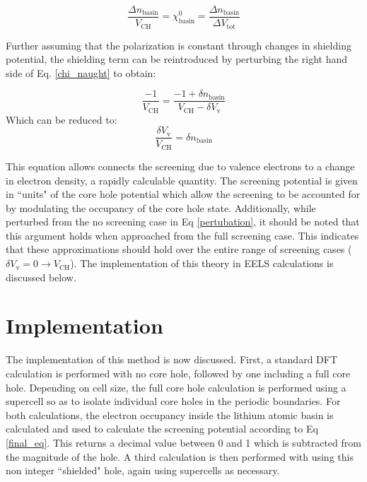 \begin{equation}
\frac{\Delta n _{\mathrm{basin}}}{V_{\mathrm{CH}}} = \chi^0_{\mathrm{basin}} = \frac{\Delta n _{\mathrm{basin}}}{\Delta V_{\mathrm{tot}}}
\label{chi_naught}
\end{equation}

Further assuming that the polarization is constant through changes in shielding potential, the shielding term can be reintroduced by perturbing the right hand side of Eq. \ref{chi_naught} to obtain: 


\begin{equation}
\frac{-1}{V_{\mathrm{CH}}} = \frac{-1+\delta n_{\mathrm{basin}}}{V_{\mathrm{CH}}-\delta V_{\mathrm{v}}}
\label{pertubation}
\end{equation}
Which can be reduced to:
\begin{equation}
\frac{\delta V_{\mathrm{v}}}{V_{\mathrm{CH}}} = \delta n_{\mathrm{basin}}
\label{final_eq}
\end{equation}

This equation allows connects the screening due to valence electrons to a change in electron density, a rapidly calculable quantity.  The screening potential is given in ``units" of the core hole potential which allow the screening to be accounted for by modulating the occupancy of the core hole state.  Additionally, while perturbed from the no screening case in Eq \ref{pertubation}, it should be noted that this argument holds when approached from the full screening case.  This indicates that these approximations should hold over the entire range of screening cases ($\delta V_{\mathrm{v}} = 0 \to V_{\mathrm{CH}}$).  The implementation of this theory in EELS calculations is discussed below.  

\section{Implementation} \label{implementation}
The implementation of this method is now discussed.  First, a standard DFT calculation is performed with no core hole, followed by one including a full core hole. Depending on cell size, the full core hole calculation is performed using a supercell so as to isolate individual core holes in the periodic boundaries. For both calculations, the electron occupancy inside the lithium atomic basin is calculated and used to calculate the screening potential according to Eq \ref{final_eq}.  This returns a decimal value between 0 and 1 which is subtracted from the magnitude of the hole.  A third calculation is then performed with using this non integer ``shielded" hole, again using supercells as necessary.  

